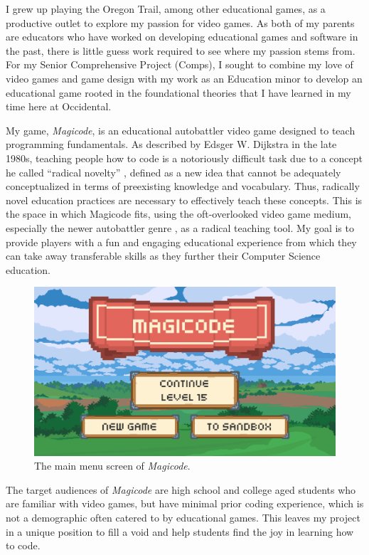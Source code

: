 \documentclass[10pt,twocolumn]{article}
\begin{document}
I grew up playing the Oregon Trail, among other educational games, as a productive outlet to explore my passion for video games. As both of my parents are educators who have worked on developing educational games and software in the past, there is little guess work required to see where my passion stems from. For my Senior Comprehensive Project (Comps), I sought to combine my love of video games and game design with my work as an Education minor to develop an educational game rooted in the foundational theories that I have learned in my time here at Occidental.

My game, \textit{Magicode}, is an educational autobattler video game designed to teach programming fundamentals. As described by Edsger W. Dijkstra in the late 1980s, teaching people how to code is a notoriously difficult task due to a concept he called “radical novelty” \cite{dijkstra-difficulty}, defined as a new idea that cannot be adequately conceptualized in terms of preexisting knowledge and vocabulary. Thus, radically novel education practices are necessary to effectively teach these concepts. This is the space in which Magicode fits, using the oft-overlooked video game medium, especially the newer autobattler genre \cite{autobattler-genre}, as a radical teaching tool. My goal is to provide players with a fun and engaging educational experience from which they can take away transferable skills as they further their Computer Science education.

\begin{figure}
    \centering
    \includegraphics[width=\linewidth]{images/screenshots/main_menu.png}
    \caption{The main menu screen of \textit{Magicode}.}
    \label{fig:main-menu}
\end{figure}

The target audiences of \textit{Magicode} are high school and college aged students who are familiar with video games, but have minimal prior coding experience, which is not a demographic often catered to by educational games. This leaves my project in a unique position to fill a void and help students find the joy in learning how to code.
\end{document}
